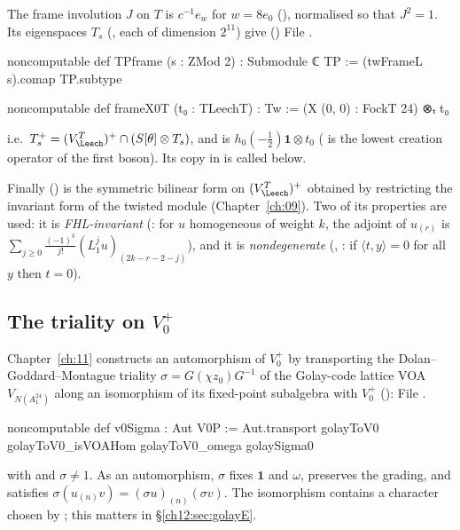 The frame involution $J$ on $T$ is $c^{-1}e_w$ for $w=8e_0$ (), normalised so that
$J^2=1$.  Its eigenspaces $T_s$ (, each of dimension $2^{11}$) give
()
File .
\begin{leancode}
noncomputable def TPframe (s : ZMod 2) : Submodule ℂ TP := (twFrameL s).comap TP.subtype

noncomputable def frameX0T (t₀ : TLeechT) : Tw := (X (0, 0) : FockT 24) ⊗ₜ t₀
\end{leancode}
i.e.\ $T_s^+=(V_\Leech^T)^+\cap(S[\theta]\otimes T_s)$, and  is
$h_0(-\tfrac12)\mathbf 1\otimes t_0$ ( is the lowest creation operator of the first
boson).  Its copy in  is called  below.

Finally  () is the symmetric bilinear form on
$(V_\Leech^T)^+$ obtained by restricting the invariant form of the twisted module
(Chapter~\ref{ch:09}).  Two of its properties are used: it is \emph{FHL-invariant}
(: for $u$ homogeneous of weight $k$, the adjoint of $u_{(r)}$ is
$\sum_{j\ge0}\frac{(-1)^k}{j!}(L_1^ju)_{(2k-r-2-j)}$), and it is \emph{nondegenerate}
(, : if
$\langle t,y\rangle=0$ for all $y$ then $t=0$).

\subsection{The triality on \texorpdfstring{$V_0^+$}{V₀⁺}}

Chapter~\ref{ch:11} constructs an automorphism of $V_0^+$ by transporting the
Dolan--Goddard--Montague triality $\sigma=G(\chi z_0)G^{-1}$ of the Golay-code lattice VOA
$V_{N(A_1^{24})}$ along an isomorphism of its fixed-point subalgebra with $V_0^+$
():
File .
\begin{leancode}
noncomputable def v0Sigma : Aut V0P :=
  Aut.transport golayToV0 golayToV0_isVOAHom golayToV0_omega golaySigma0
\end{leancode}
with  and $\sigma\ne1$.  As an automorphism, $\sigma$ fixes
$\mathbf 1$ and $\omega$, preserves the grading, and satisfies $\sigma(u_{(n)}v)=(\sigma u)_{(n)}(\sigma v)$.
The isomorphism  contains a character  chosen by ;
this matters in \S\ref{ch12:sec:golayE}.

